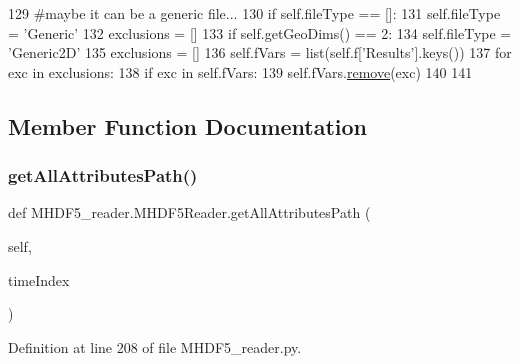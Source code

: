 \begin{DoxyCode}
129             \textcolor{comment}{#maybe it can be a generic file...}
130             \textcolor{keywordflow}{if} self.fileType == []:
131                 self.fileType = \textcolor{stringliteral}{'Generic'}
132                 exclusions = []                
133                 \textcolor{keywordflow}{if} self.getGeoDims() == 2:
134                     self.fileType = \textcolor{stringliteral}{'Generic2D'}
135                     exclusions = []
136                 self.fVars = list(self.f[\textcolor{stringliteral}{'Results'}].keys())                
137                 \textcolor{keywordflow}{for} exc \textcolor{keywordflow}{in} exclusions:
138                     \textcolor{keywordflow}{if} exc \textcolor{keywordflow}{in} self.fVars:
139                         self.fVars.\mbox{\hyperlink{namespaceabstract__linkedlist__mod_a9f4028744d1ca6536e28c76d2795ace3}{remove}}(exc)
140                 
141                 
\end{DoxyCode}


\subsection{Member Function Documentation}
\mbox{\label{class_m_h_d_f5__reader_1_1_m_h_d_f5_reader_ac1ab22571dbffbce200aec34fd658dc5}} 
\subsubsection{\texorpdfstring{get\+All\+Attributes\+Path()}{getAllAttributesPath()}}
{\footnotesize\ttfamily def M\+H\+D\+F5\+\_\+reader.\+M\+H\+D\+F5\+Reader.\+get\+All\+Attributes\+Path (\begin{DoxyParamCaption}\item[{}]{self,  }\item[{}]{time\+Index }\end{DoxyParamCaption})}



Definition at line 208 of file M\+H\+D\+F5\+\_\+reader.\+py.


